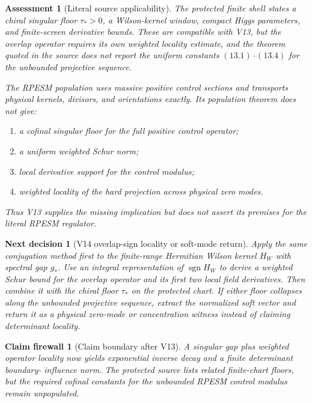 \documentclass[11pt]{article}
\newtheorem{firewall}[theorem]{Claim firewall}
\newtheorem{decision}[theorem]{Next decision}
\newtheorem{assessment}[theorem]{Assessment}
\theoremstyle{remark}
\begin{document}
\begin{assessment}[Literal source applicability]
\label{ass:v15v13-source}
The protected finite shell states a chiral singular floor
\(\tau_*>0\), a Wilson-kernel window, compact Higgs parameters,
and finite-screen derivative bounds.  These are compatible with
V13, but the overlap operator requires its own weighted locality
estimate, and the theorem quoted in the source does not report the
uniform constants \((13.1)\)--\((13.4)\) for the unbounded
projective sequence.

The RPESM population uses massive positive control sections and
transports physical kernels, divisors, and orientations exactly.
Its population theorem does not give:
\begin{enumerate}
\item a cofinal singular floor for the full positive control
      operator;
\item a uniform weighted Schur norm;
\item local derivative support for the control modulus;
\item weighted locality of the hard projection across physical
      zero modes.
\end{enumerate}
Thus V13 supplies the missing implication but does not assert its
premises for the literal RPESM regulator.
\end{assessment}

\begin{decision}[V14 overlap-sign locality or soft-mode return]
\label{dec:v15v13-next}
Apply the same conjugation method first to the finite-range
Hermitian Wilson kernel \(H_W\) with spectral gap \(g_*\).
Use an integral representation of
\(\operatorname{sgn}H_W\) to derive a weighted Schur bound for the
overlap operator and its first two local field derivatives.
Then combine it with the chiral floor \(\tau_*\) on the protected
chart.  If either floor collapses along the unbounded projective
sequence, extract the normalized soft vector and return it as a
physical zero-mode or concentration witness instead of claiming
determinant locality.
\end{decision}

\begin{firewall}[Claim boundary after V13]
\label{fire:v15v13}
A singular gap plus weighted operator locality now yields
exponential inverse decay and a finite determinant boundary-
influence norm.  The protected source lists related finite-chart
floors, but the required cofinal constants for the unbounded
RPESM control modulus remain unpopulated.
\end{firewall}
\end{document}
